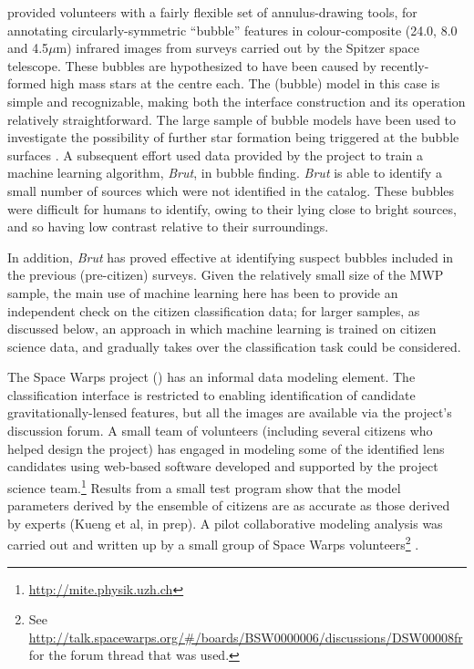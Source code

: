\documentclass{ar2e}
\begin{document}

\citet{Simpson++2012MWP} provided volunteers with a fairly flexible set of
annulus-drawing tools, for annotating circularly-symmetric ``bubble'' features
in colour-composite (24.0, 8.0 and  4.5$\mu$m) infrared images from surveys
carried out by the Spitzer space telescope. These bubbles are hypothesized  to
have been caused by recently-formed high mass stars at the centre each. The
(bubble) model in this case is simple and recognizable, making both the
interface construction and its operation relatively straightforward. The large
sample of  bubble models have been used to investigate the possibility of
further star formation being triggered at the bubble surfaces
\citep{KendrewEtal2012}. A subsequent effort \citep{Beaumont} used data provided
by the project to train a machine learning algorithm, \emph{Brut}, in bubble
finding. \emph{Brut} is able to identify a small number of sources  which were
not identified in the \citeauthor{Simpson++2012MWP} catalog. These bubbles were
difficult for humans to identify,  owing to their lying close to bright sources,
and so having low contrast relative to their surroundings.

In addition, \emph{Brut} has proved effective at identifying suspect bubbles
included in the previous (pre-citizen) surveys. Given the relatively small size
of the MWP sample, the main use of machine learning here has been to provide an
independent check on the citizen classification data; for larger samples, as
discussed below, an approach in which machine learning is trained on citizen
science data, and gradually takes over the classification task could be
considered. 


The Space Warps project () has an informal data
modeling element. The classification interface is restricted to enabling
identification of candidate gravitationally-lensed features, but all the images
are available via the project's discussion forum. A small team of volunteers
(including several citizens who helped design the project) has engaged in
modeling some of the identified lens candidates using web-based software
developed and supported by the project science
team.\footnote{\url{http://mite.physik.uzh.ch}} Results from a small test
program show that the model parameters derived by the  ensemble of citizens are
as accurate as those derived by experts 
(Kueng et al, in prep).
A pilot collaborative modeling analysis was carried out and written up by a
small group of Space Warps volunteers\footnote{See
\url{http://talk.spacewarps.org/\#/boards/BSW0000006/discussions/DSW00008fr} for
the forum thread that was used.} \citep{Wilcox2014}.
\end{document}
